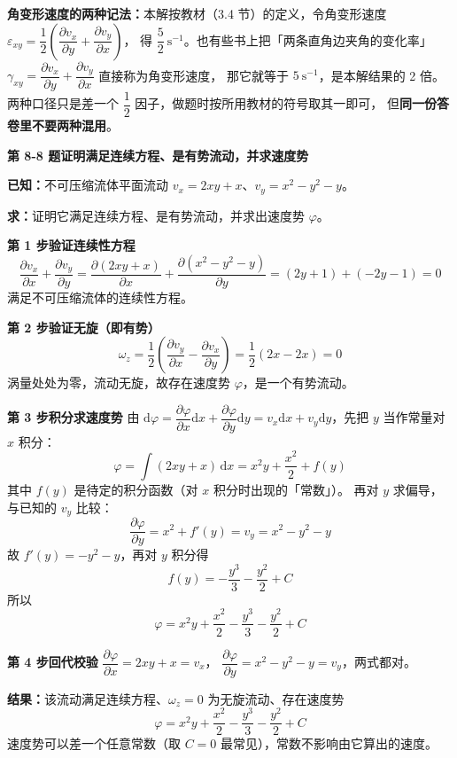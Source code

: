 \begin{tishi}
\textbf{角变形速度的两种记法：}本解按教材（3.4 节）的定义，令角变形速度
$\varepsilon_{xy}=\dfrac{1}{2}\left(\dfrac{\partial v_x}{\partial y}+\dfrac{\partial v_y}{\partial x}\right)$，
得 $\dfrac{5}{2}\ \mathrm{s^{-1}}$。也有些书上把「两条直角边夹角的变化率」
$\gamma_{xy}=\dfrac{\partial v_x}{\partial y}+\dfrac{\partial v_y}{\partial x}$ 直接称为角变形速度，
那它就等于 $5\ \mathrm{s^{-1}}$，是本解结果的 2 倍。
两种口径只是差一个 $\dfrac{1}{2}$ 因子，做题时按所用教材的符号取其一即可，
但\textbf{同一份答卷里不要两种混用}。
\end{tishi}

\noindent\textbf{第 8-8 题\quad 证明满足连续方程、是有势流动，并求速度势}

\begin{jie}
\textbf{已知：}不可压缩流体平面流动 $v_x=2xy+x$、$v_y=x^2-y^2-y$。

\textbf{求：}证明它满足连续方程、是有势流动，并求出速度势 $\varphi$。

\textbf{第 1 步\quad 验证连续性方程}
\[ \frac{\partial v_x}{\partial x}+\frac{\partial v_y}{\partial y}
 =\frac{\partial(2xy+x)}{\partial x}+\frac{\partial(x^2-y^2-y)}{\partial y}
 =(2y+1)+(-2y-1)=0 \]
满足不可压缩流体的连续性方程。

\textbf{第 2 步\quad 验证无旋（即有势）}
\[ \omega_z=\frac{1}{2}\left(\frac{\partial v_y}{\partial x}-\frac{\partial v_x}{\partial y}\right)
 =\frac{1}{2}\left(2x-2x\right)=0 \]
涡量处处为零，流动无旋，故存在速度势 $\varphi$，是一个有势流动。

\textbf{第 3 步\quad 积分求速度势}
由 $\mathrm{d}\varphi=\dfrac{\partial\varphi}{\partial x}\mathrm{d}x+\dfrac{\partial\varphi}{\partial y}\mathrm{d}y
=v_x\mathrm{d}x+v_y\mathrm{d}y$，先把 $y$ 当作常量对 $x$ 积分：
\[ \varphi=\int(2xy+x)\,\mathrm{d}x=x^2y+\frac{x^2}{2}+f(y) \]
其中 $f(y)$ 是待定的积分函数（对 $x$ 积分时出现的「常数」）。
再对 $y$ 求偏导，与已知的 $v_y$ 比较：
\[ \frac{\partial\varphi}{\partial y}=x^2+f'(y)=v_y=x^2-y^2-y \]
故 $f'(y)=-y^2-y$，再对 $y$ 积分得
\[ f(y)=-\frac{y^3}{3}-\frac{y^2}{2}+C \]
所以
\[ \varphi=x^2y+\frac{x^2}{2}-\frac{y^3}{3}-\frac{y^2}{2}+C \]

\textbf{第 4 步\quad 回代校验}
$\dfrac{\partial\varphi}{\partial x}=2xy+x=v_x$，
$\dfrac{\partial\varphi}{\partial y}=x^2-y^2-y=v_y$，两式都对。

\textbf{结果：}该流动满足连续方程、$\omega_z=0$ 为无旋流动、存在速度势
\[ \varphi=x^2y+\frac{x^2}{2}-\frac{y^3}{3}-\frac{y^2}{2}+C \]
速度势可以差一个任意常数（取 $C=0$ 最常见），常数不影响由它算出的速度。
\end{jie}

